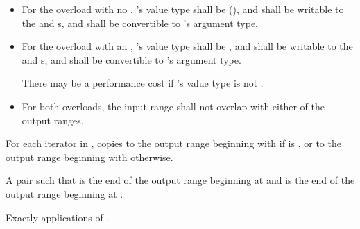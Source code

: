 \begin{itemdescr}
\pnum
\requires
\begin{itemize}
\item
For the overload with no , 's
value type shall be  (),
and shall be writable to the 
and  s, and shall be convertible to
's argument type.

\item
For the overload with an , 's
value type shall be , and shall be writable to the
 and  s, and shall be
convertible to 's argument type.
\begin{note}
There may be a performance cost if 's value type is not
.
\end{note}

\item
For both overloads, the input range shall not overlap with either of the output ranges.
\end{itemize}

\pnum
\effects For each iterator  in , copies  to the output range beginning with  if  is , or to the output range beginning with  otherwise.

\pnum
\returns A pair  such that  is the end of the output range beginning at  and  is the end of the output range beginning at .

\pnum
\complexity Exactly  applications of .
\end{itemdescr}

